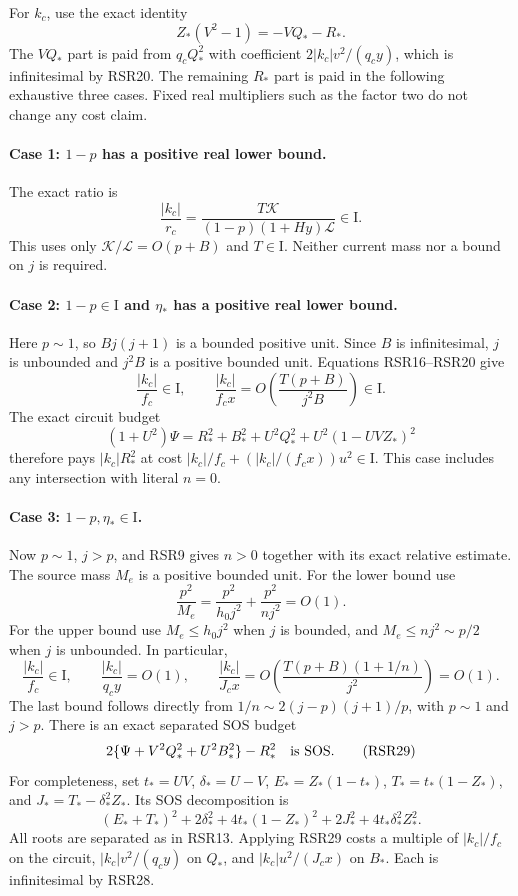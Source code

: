 For $k_c$, use the exact identity
\[
 Z_*(V^2-1)=-VQ_*-R_*.
 \tag{RSR24}
\]
The $VQ_*$ part is paid from $q_cQ_*^2$ with coefficient
$2|k_c|v^2/(q_cy)$, which is infinitesimal by RSR20. The remaining
$R_*$ part is paid in the following exhaustive three cases. Fixed
real multipliers such as the factor two do not change any cost claim.

\paragraph{Case 1: $1-p$ has a positive real lower bound.}
The exact ratio is
\[
 \frac{|k_c|}{r_c}
 =\frac{T\mathcal K}{(1-p)(1+Hy)\mathcal L}\in\mathrm I.
 \tag{RSR25}
\]
This uses only $\mathcal K/\mathcal L=O(p+B)$ and $T\in\mathrm I$.
Neither current mass nor a bound on $j$ is required.

\paragraph{Case 2: $1-p\in\mathrm I$ and $\eta_*$ has a positive real
lower bound.}
Here $p\sim1$, so $Bj(j+1)$ is a bounded positive unit. Since $B$ is
infinitesimal, $j$ is unbounded and $j^2B$ is a positive bounded unit.
Equations RSR16--RSR20 give
\[
 \frac{|k_c|}{f_c}\in\mathrm I,\qquad
 \frac{|k_c|}{f_cx}
 =O\!\left(\frac{T(p+B)}{j^2B}\right)\in\mathrm I.
 \tag{RSR26}
\]
The exact circuit budget
\[
 (1+U^2)\Psi=R_*^2+B_*^2+U^2Q_*^2+U^2(1-UVZ_*)^2
 \tag{RSR27}
\]
therefore pays $|k_c|R_*^2$ at cost
$|k_c|/f_c+(|k_c|/(f_cx))u^2\in\mathrm I$.
This case includes any intersection with literal $n=0$.

\paragraph{Case 3: $1-p,\eta_*\in\mathrm I$.}
Now $p\sim1$, $j>p$, and RSR9 gives $n>0$ together with its exact
relative estimate. The source mass $M_e$ is a positive bounded unit.
For the lower bound use
\[
 \frac{p^2}{M_e}
 =\frac{p^2}{h_0j^2}+\frac{p^2}{nj^2}=O(1).
\]
For the upper bound use $M_e\leq h_0j^2$ when $j$ is bounded,
and $M_e\leq nj^2\sim p/2$ when $j$ is unbounded. In particular,
\[
 \frac{|k_c|}{f_c}\in\mathrm I,\qquad
 \frac{|k_c|}{q_cy}=O(1),\qquad
 \frac{|k_c|}{J_cx}
 =O\!\left(\frac{T(p+B)(1+1/n)}{j^2}\right)=O(1).
 \tag{RSR28}
\]
The last bound follows directly from
$1/n\sim2(j-p)(j+1)/p$, with $p\sim1$ and $j>p$.
There is an exact separated SOS budget
\[
 2\{\Psi+V^2Q_*^2+U^2B_*^2\}-R_*^2\quad\hbox{is SOS}.
 \tag{RSR29}
\]
For completeness, set $t_*=UV$, $\delta_*=U-V$,
$E_*=Z_*(1-t_*)$, $T_*=t_*(1-Z_*)$, and
$J_*=T_*-\delta_*^2Z_*$. Its SOS decomposition is
\[
 (E_*+T_*)^2+2\delta_*^2+4t_*(1-Z_*)^2
                       +2J_*^2+4t_*\delta_*^2Z_*^2.
\]
All roots are separated as in RSR13. Applying RSR29 costs a multiple
of $|k_c|/f_c$ on the circuit, $|k_c|v^2/(q_cy)$ on $Q_*$,
and $|k_c|u^2/(J_cx)$ on $B_*$. Each is infinitesimal by RSR28.

